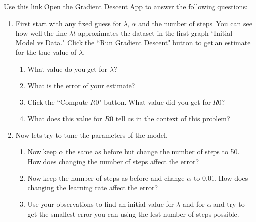 \documentclass[11pt]{article}
\begin{document}
Use this link \href{https://woodword0-gradientdescentapplication2.hf.space/}{Open the Gradient Descent App} to answer the following questions:
\begin{enumerate}
\item First start with any fixed guess for $\lambda$, $\alpha$ and the number of steps. You can see how well the line $\lambda t$ approximates the dataset in the first graph ``Initial Model vs Data." Click the ``Run Gradient Descent" button to get an estimate for the true value of $\lambda$. 
    \begin{enumerate}
    \item[(a)] What value do you get for $\lambda$? 
    \vspace{3cm}
    
    \item[(b)] What is the error of your estimate?
    \vspace{3cm}

    \item[(c)] Click the ``Compute $R0$" button. What value did you get for $R0$?
    \vspace{3cm}

    \item[(d)]  What does this value for $R0$ tell us in the context of this problem?
    \vspace{3cm}




        \end{enumerate}

\item Now lets try to tune the parameters of the model.
\begin{enumerate}
\item[(a)] Now keep $\alpha$ the same as before but change the number of steps to 50. How does changing the number of steps affect the error?
\vspace{4cm}

\item[(b)] Now keep the number of steps as before  and change $\alpha$ to 0.01. How does changing the learning rate affect the error?
\vspace{4cm}

\item[(c)] Use your observations to find an initial value for $\lambda$ and for $\alpha$ and try to get the smallest error you can using the lest number of steps possible.
\vspace{4cm}




\end{enumerate}
\end{enumerate}
\end{document}
